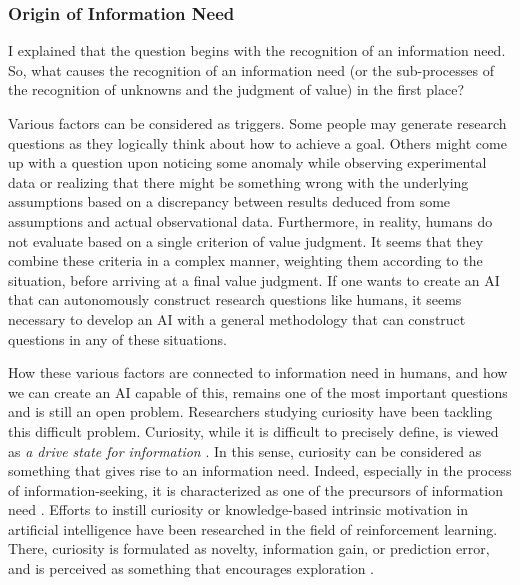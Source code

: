\subsubsection{Origin of Information Need}
I explained that the question begins with the recognition of an information need. So, what causes the recognition of an information need (or the sub-processes of the recognition of unknowns and the judgment of value) in the first place?

Various factors can be considered as triggers. Some people may generate research questions as they logically think about how to achieve a goal. Others might come up with a question upon noticing some anomaly while observing experimental data or realizing that there might be something wrong with the underlying assumptions based on a discrepancy between results deduced from some assumptions and actual observational data. Furthermore, in reality, humans do not evaluate based on a single criterion of value judgment. It seems that they combine these criteria in a complex manner, weighting them according to the situation, before arriving at a final value judgment.
If one wants to create an AI that can autonomously construct research questions like humans, it seems necessary to develop an AI with a general methodology that can construct questions in any of these situations.

How these various factors are connected to information need in humans, and how we can create an AI capable of this, remains one of the most important questions and is still an open problem. Researchers studying curiosity have been tackling this difficult problem. Curiosity, while it is difficult to precisely define, is viewed as \textit{a drive state for information} \cite{kidd2015psychology}. In this sense, curiosity can be considered as something that gives rise to an information need. Indeed, especially in the process of information-seeking, it is characterized as one of the precursors of information need \cite{case2016looking}. Efforts to instill curiosity \cite{schmidhuber1991possibility} or knowledge-based intrinsic motivation \cite{oudeyer2007intrinsic} in artificial intelligence have been researched in the field of reinforcement learning. There, curiosity is formulated as novelty, information gain, or prediction error, and is perceived as something that encourages exploration \cite{aubret2019survey}.


